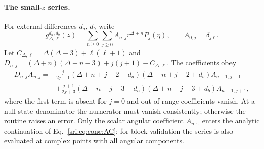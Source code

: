 \paragraph{The small-$z$ series.} For external differences $d_a$, $d_b$ write
\begin{equation}
 g_{\Delta,\ell}^{d_a,d_b}(z)=\sum_{n\ge0}\sum_{j\ge0}A_{n,j}r^{\Delta+n}P_j(\eta),\qquad A_{0,j}=\delta_{j\ell}.
\end{equation}
Let $C_{\Delta,\ell}=\Delta(\Delta-3)+\ell(\ell+1)$ and $D_{n,j}=(\Delta+n)(\Delta+n-3)+j(j+1)-C_{\Delta,\ell}$. The
coefficients obey
\begin{equation}
\begin{aligned}
 D_{n,j}A_{n,j}={}&\frac{j}{2j-1}(\Delta+n+j-2-d_a)(\Delta+n+j-2+d_b)A_{n-1,j-1}\\
 &+\frac{j+1}{2j+3}(\Delta+n-j-3-d_a)(\Delta+n-j-3+d_b)A_{n-1,j+1},
\end{aligned}
 \label{sri:eq:cone:zrec}
\end{equation}
where the first term is absent for $j=0$ and out-of-range coefficients vanish. At a null-state denominator the
numerator must vanish consistently; otherwise the routine raises an error. Only the scalar angular coefficient
$A_{n,0}$ enters the analytic continuation of Eq.~\eqref{sri:eq:cone:AC}; for block validation the series is also evaluated
at complex points with all angular components.

